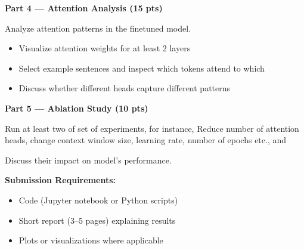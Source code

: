 \documentclass[12pt]{article}
\begin{document}
\begin{enumerate}[leftmargin=1.25em]
    \vspace{0.5em}
    
    \textbf{Part 4 — Attention Analysis (15 pts)}
    
    Analyze attention patterns in the finetuned model.
    
    \begin{itemize}
    \item Visualize attention weights for at least 2 layers
    \item Select example sentences and inspect which tokens attend to which
    \item Discuss whether different heads capture different patterns
    \end{itemize}
    
    \vspace{0.5em}
    
    \textbf{Part 5 — Ablation Study (10 pts)}
    
    Run at least two of set of experiments, for instance, Reduce number of attention heads, change context window size, learning rate, number of epochs etc., and 
        
    Discuss their impact on model's performance. 
    
    \vspace{0.5em}
    
    
    
    
    
    
    \textbf{Submission Requirements:}
    \begin{itemize}
    \item Code (Jupyter notebook or Python scripts)
    \item Short report (3–5 pages) explaining results
    \item Plots or visualizations where applicable
    \end{itemize}
    

\end{enumerate}
\end{document}
